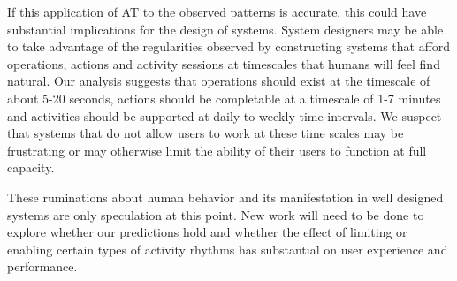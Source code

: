 If this application of AT to the observed patterns is accurate, this could have substantial implications for the design of systems.  System designers may be able to take advantage of the regularities observed by constructing systems that afford operations, actions and activity sessions at timescales that humans will feel find natural.  Our analysis suggests that operations should exist at the timescale of about 5-20 seconds, actions should be completable at a timescale of 1-7 minutes and activities should be supported at daily to weekly time intervals.  We suspect that systems that do not allow users to work at these time scales may be frustrating or may otherwise limit the ability of their users to function at full capacity.

These ruminations about human behavior and its manifestation in well designed systems are only speculation at this point.  New work will need to be done to explore whether our predictions hold and whether the effect of limiting or enabling certain types of activity rhythms has substantial on user experience and performance.
